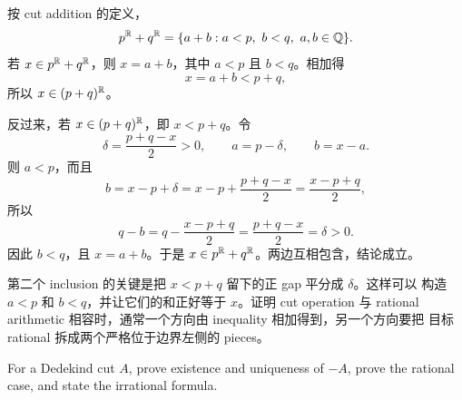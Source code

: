 \begin{solution}
按 cut addition 的定义，
\[
  p^{\mathbb{R}}+q^{\mathbb{R}}
  =\{a+b:a<p,\ b<q,\ a,b\in\mathbb{Q}\}.
\]
若 \(x\in p^{\mathbb{R}}+q^{\mathbb{R}}\)，则 \(x=a+b\)，其中 \(a<p\) 且 \(b<q\)。相加得
\[
  x=a+b<p+q,
\]
所以 \(x\in(p+q)^{\mathbb{R}}\)。

反过来，若 \(x\in(p+q)^{\mathbb{R}}\)，即 \(x<p+q\)。令
\[
  \delta=\frac{p+q-x}{2}>0,\qquad a=p-\delta,\qquad b=x-a.
\]
则 \(a<p\)，而且
\[
  b=x-p+\delta
   =x-p+\frac{p+q-x}{2}
   =\frac{x-p+q}{2},
\]
所以
\[
  q-b
  =q-\frac{x-p+q}{2}
  =\frac{p+q-x}{2}
  =\delta>0.
\]
因此 \(b<q\)，且 \(x=a+b\)。于是 \(x\in p^{\mathbb{R}}+q^{\mathbb{R}}\)。两边互相包含，结论成立。
\end{solution}

\begin{explanation}
第二个 inclusion 的关键是把 \(x<p+q\) 留下的正 gap 平分成 \(\delta\)。这样可以
构造 \(a<p\) 和 \(b<q\)，并让它们的和正好等于 \(x\)。证明 cut operation 与
rational arithmetic 相容时，通常一个方向由 inequality 相加得到，另一个方向要把
目标 rational 拆成两个严格位于边界左侧的 pieces。
\end{explanation}

\begin{exerciseblock}
For a Dedekind cut \(A\), prove existence and uniqueness of \(-A\), prove the
rational case, and state the irrational formula.
\end{exerciseblock}

